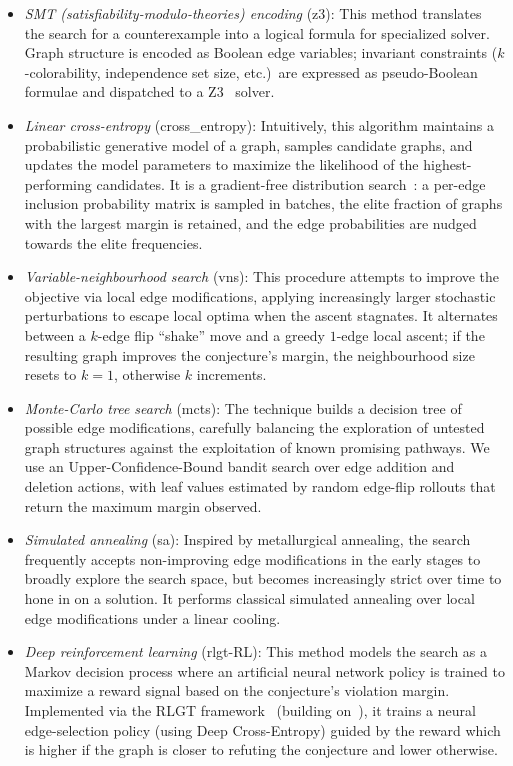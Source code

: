 \documentclass[]{ceurart}
\begin{document}
\begin{itemize}
  \item \emph{SMT (satisfiability-modulo-theories) encoding} (\textsf{z3}): This method translates the search for a counterexample into a logical formula for specialized solver. Graph structure is encoded as Boolean edge variables; invariant constraints ($k$-colorability, independence set size, etc.)\ are expressed as pseudo-Boolean formulae and dispatched to a Z3~\cite{demoura2008z3} solver.
  \item \emph{Linear cross-entropy} (\textsf{cross\_entropy}): Intuitively, this algorithm maintains a probabilistic generative model of a graph, samples candidate graphs, and updates the model parameters to maximize the likelihood of the highest-performing candidates. It is a gradient-free distribution search~\cite{wagner2021constructions}: a per-edge inclusion probability matrix is sampled in batches, the elite fraction of graphs with the largest margin is retained, and the edge probabilities are nudged towards the elite frequencies.
  \item \emph{Variable-neighbourhood search} (\textsf{vns}): This procedure attempts to improve the objective via local edge modifications, applying increasingly larger stochastic perturbations to escape local optima when the ascent stagnates. It alternates between a $k$-edge flip ``shake'' move and a greedy $1$-edge local ascent; if the resulting graph improves the conjecture's margin, the neighbourhood size resets to $k=1$, otherwise $k$ increments.
  \item \emph{Monte-Carlo tree search} (\textsf{mcts}): The technique builds a decision tree of possible edge modifications, carefully balancing the exploration of untested graph structures against the exploitation of known promising pathways. We use an Upper-Confidence-Bound bandit search over edge addition and deletion actions, with leaf values estimated by random edge-flip rollouts that return the maximum margin observed.
  \item \emph{Simulated annealing} (\textsf{sa}): Inspired by metallurgical annealing, the search frequently accepts non-improving edge modifications in the early stages to broadly explore the search space, but becomes increasingly strict over time to hone in on a solution. It performs classical simulated annealing over local edge modifications under a linear cooling.
  \item \emph{Deep reinforcement learning} (\textsf{rlgt-RL}): This method models the search as a Markov decision process where an artificial neural network policy is trained to maximize a reward signal based on the conjecture's violation margin. Implemented via the RLGT framework~\cite{damnjanovic2026rlgt} (building on~\cite{wagner2021constructions}), it trains a neural edge-selection policy (using Deep Cross-Entropy) guided by the reward which is higher if the graph is closer to refuting the conjecture and lower otherwise.
\end{itemize}
\end{document}

